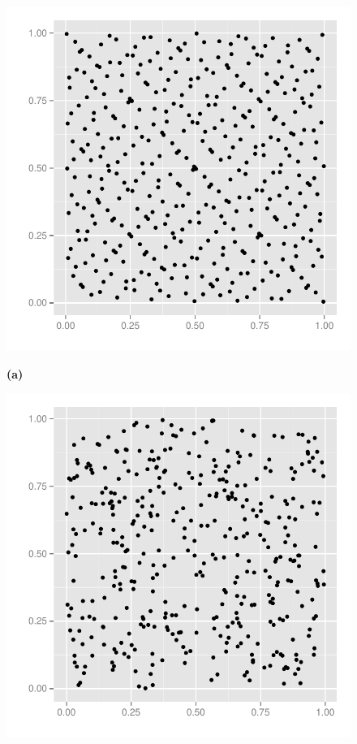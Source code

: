 \documentclass{llncs2e/llncs}
\begin{document}
\begin{figure}
  \centering
  \begin{minipage}{0.45\linewidth}
    \begin{center}
      \includegraphics[width=\textwidth]{../report/graphics/2D-sobol-sequence.pdf}

      \hspace{0.55cm}\textbf{(a)}
    \end{center}
  \end{minipage}
  \begin{minipage}{0.45\linewidth}
    \begin{center}
      \includegraphics[width=\textwidth]{../report/graphics/2D-mersenne-sequence.pdf}


\end{center}
\end{minipage}
\end{figure}
\end{document}
